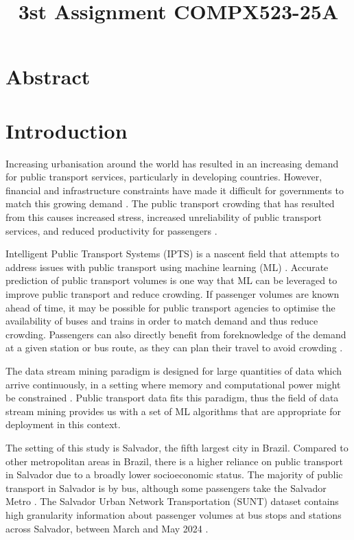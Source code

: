 \documentclass[11pt]{article} %
\title{3st Assignment COMPX523-25A}
\author{}
\begin{document}
\maketitle

\tableofcontents
\newpage
{}
	
\section{Abstract}

\section{Introduction}

Increasing urbanisation around the world has resulted in an increasing demand for public transport services, particularly in developing countries. However, financial and infrastructure constraints have made it difficult for governments to match this growing demand \cite{motta2013crisis}. The public transport crowding that has resulted from this causes increased stress, increased unreliability of public transport services, and reduced productivity for passengers \cite{tirachini2013crowding}.

Intelligent Public Transport Systems (IPTS) is a nascent field that attempts to address issues with public transport using machine learning (ML) \cite{zear2016intelligent}. Accurate prediction of public transport volumes is one way that ML can be leveraged to improve public transport and reduce crowding. If passenger volumes are known ahead of time, it may be possible for public transport agencies to optimise the availability of buses and trains in order to match demand and thus reduce crowding. Passengers can also directly benefit from foreknowledge of the demand at a given station or bus route, as they can plan their travel to avoid crowding \cite{di2024machine}.

The data stream mining paradigm is designed for large quantities of data which arrive continuously, in a setting where memory and computational power might be constrained \cite{bifet2023machine}. Public transport data fits this paradigm, thus the field of data stream mining provides us with a set of ML algorithms that are appropriate for deployment in this context.

The setting of this study is Salvador, the fifth largest city in Brazil. Compared to other metropolitan areas in Brazil, there is a higher reliance on public transport in Salvador due to a broadly lower socioeconomic status. The majority of public transport in Salvador is by bus, although some passengers take the Salvador Metro \cite{harrison2016brics}. The Salvador Urban Network Transportation (SUNT) dataset contains high granularity information about passenger volumes at bus stops and stations across Salvador, between March and May 2024 \cite{SUNT2025}.
\end{document}
